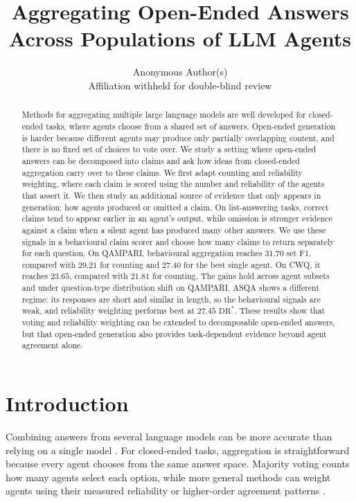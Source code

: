 \documentclass{article}
\title{Aggregating Open-Ended Answers Across Populations of LLM Agents}
\author{%
  Anonymous Author(s) \\
  Affiliation withheld for double-blind review \\
}
\begin{document}
\maketitle

\begin{abstract}
Methods for aggregating multiple large language models are well developed for closed-ended tasks, where agents choose from a shared set of answers. Open-ended generation is harder because different agents may produce only partially overlapping content, and there is no fixed set of choices to vote over. We study a setting where open-ended answers can be decomposed into claims and ask how ideas from closed-ended aggregation carry over to these claims. We first adapt counting and reliability weighting, where each claim is scored using the number and reliability of the agents that assert it. We then study an additional source of evidence that only appears in generation: how agents produced or omitted a claim. On list-answering tasks, correct claims tend to appear earlier in an agent's output, while omission is stronger evidence against a claim when a silent agent has produced many other answers. We use these signals in a behavioural claim scorer and choose how many claims to return separately for each question. On QAMPARI, behavioural aggregation reaches $31.70$ set F1, compared with $29.21$ for counting and $27.40$ for the best single agent. On CWQ, it reaches $23.65$, compared with $21.81$ for counting. The gains hold across agent subsets and under question-type distribution shift on QAMPARI. ASQA shows a different regime: its responses are short and similar in length, so the behavioural signals are weak, and reliability weighting performs best at $27.45$ $\mathrm{DR}^*$. These results show that voting and reliability weighting can be extended to decomposable open-ended answers, but that open-ended generation also provides task-dependent evidence beyond agent agreement alone.
\end{abstract}

\section{Introduction}
\label{sec:intro}

Combining answers from several language models can be more accurate than relying on a single model \cite{li2024agents}. For closed-ended tasks, aggregation is straightforward because every agent chooses from the same answer space. Majority voting counts how many agents select each option, while more general methods can weight agents using their measured reliability or higher-order agreement patterns \cite{ai2025majority}.
\end{document}
